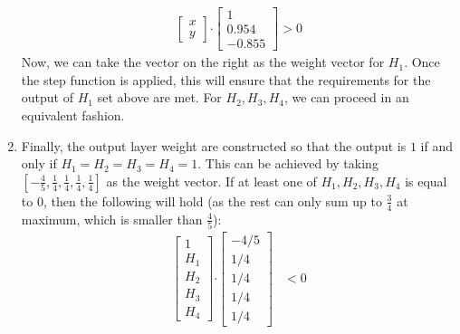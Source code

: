\documentclass[12pt]{article}
\begin{document}
\begin{enumerate}
\begin{align}
\begin{bmatrix}
           x \\
           y
         \end{bmatrix}  \boldsymbol{\cdot} \begin{bmatrix}
           1 \\
           0.954 \\
           -0.855
         \end{bmatrix} > 0
  \end{align}
Now, we can take the vector on the right as the weight vector for $H_1$. Once the step function is applied, this will ensure that the requirements for the output of $H_1$ set above are met.
For $H_2, H_3, H_4$, we can proceed in an equivalent fashion.
  
\item Finally, the output layer weight are constructed so that the output is $1$ if and only if $H_1 = H_2 = H_3 = H_4 = 1$. This can be achieved by taking $[-\frac{4}{5}, \frac{1}{4}, \frac{1}{4}, \frac{1}{4},\frac{1}{4}]$ as the weight vector. If at least one of $H_1, H_2, H_3, H_4$ is equal to $0$, then the following will hold (as the rest can only sum up to $\frac{3}{4}$ at maximum, which is smaller than $\frac{4}{5}$):
\begin{align}
     \begin{bmatrix}
           1 \\
           H_1 \\
           H_2 \\
           H_3 \\
           H_4 
         \end{bmatrix} \boldsymbol{\cdot} \begin{bmatrix}
           -4/5 \\
           1/4\\
           1/4\\
           1/4\\
           1/4
         \end{bmatrix} & < 0
\end{align}
\end{enumerate}
\newpage
\end{document}
